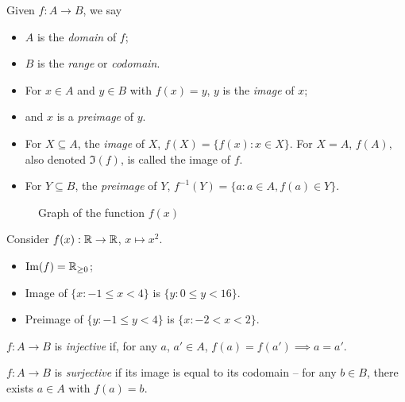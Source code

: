 \documentclass{../template/note}
\begin{document}
    \begin{definition}
        Given \(f: A \to B\), we say
        \begin{itemize}
            \item \(A\) is the \emph{domain} of \(f\);
            \item \(B\) is the \emph{range} or \emph{codomain}.
            \item For \(x \in A\) and \(y \in B\) with \(f(x) = y\), \(y\) is the \emph{image} of \(x\);
            \item and \(x\) is a \emph{preimage} of \(y\).
            \item For \(X \subseteq A\), the \emph{image} of \(X\), \(f(X) = \{f(x): x \in X\}\). For \(X = A\), \(f(A)\), also denoted \(\Im(f)\), is called the image of \(f\).
            \item For \(Y \subseteq B\), the \emph{preimage} of \(Y\), \(f^{-1}(Y) = \{a: a \in A, f(a) \in Y\}\).
        \end{itemize}
    \end{definition}

    \begin{figure}[ht]
            \centering
            \caption{Graph of the function \(f(x)\)}
            \label{fig:x2-function-example}
        \end{figure}

    \begin{example}
        Consider \(f(x): \mathbb R \to \mathbb R\), \(x \mapsto x^2\). 
        \begin{itemize}
            \item \(\operatorname{Im}(f) = \mathbb R_{\geq 0}\);
            \item Image of \(\{x: -1 \leq x < 4\}\) is \(\{y: 0 \leq y < 16\}\).
            \item Preimage of \(\{y: -1 \leq y < 4\}\) is \(\{x: -2 < x < 2\}\).
        \end{itemize}
        
        
        
    \end{example}
    
    \begin{definition}
        \(f: A \to B\) is \emph{injective} if, for any \(a\), \(a' \in A\), \(f(a) = f(a') \implies a = a'\).
    \end{definition}
    
    \begin{definition}
        \(f: A \to B\) is \emph{surjective} if its image is equal to its codomain -- for any \(b \in B\), there exists \(a \in A\) with \(f(a)=b\).
    \end{definition}
    
\end{document}
